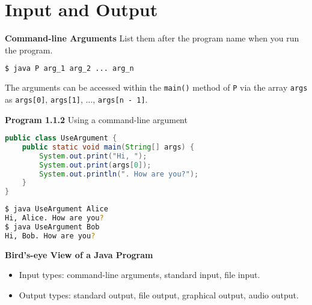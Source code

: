 \documentclass[8pt,a4paper,compress]{beamer}
\begin{document}
\section{Input and Output}
\begin{frame}[fragile]
\pause

\textbf{Command-line Arguments} List them after the program name when you run the program.

\begin{lstlisting}[language=bash]
$ java P arg_1 arg_2 ... arg_n
\end{lstlisting}

The arguments can be accessed within the \texttt{main()} method of  \texttt{P} via the array \texttt{args}  as \texttt{args[0]}, \texttt{args[1]}, $\dots$, \texttt{args[n - 1]}.

\pause
\smallskip

\textbf{Program 1.1.2} Using a command-line argument

\begin{lstlisting}[language=Java]
public class UseArgument {
    public static void main(String[] args) {
        System.out.print("Hi, ");
        System.out.print(args[0]);
        System.out.println(". How are you?");
    }
}
\end{lstlisting}

\pause

\begin{lstlisting}[language=bash]
$ java UseArgument Alice
Hi, Alice. How are you?
$ java UseArgument Bob
Hi, Bob. How are you?
\end{lstlisting}

\pause
\smallskip

\textbf{Bird's-eye View of a Java Program}
\begin{center}
\end{center}
\begin{itemize}
\item Input types: command-line arguments, standard input, file input.
\item Output types: standard output, file output, graphical output, audio output.
\end{itemize}
\end{frame}
\end{document}
